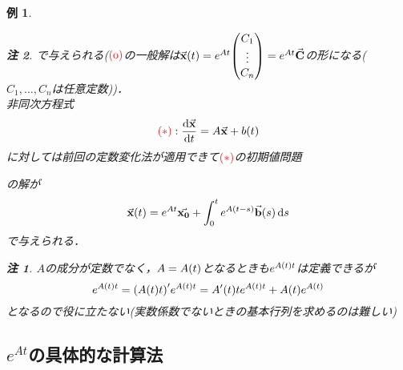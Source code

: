 \documentclass[autodetect-engine,dvipdfmx-if-dvi,ja=standard]{bxjsarticle}
\theoremstyle{mystyle1}
\theoremstyle{mystyle2}
\newtheorem{example}{例}
\newtheorem{note}{注}
\newcommand{\redast}{\ensuremath{\color{red}\qty(\ast)\color{black}}}
\newcommand{\redo}{\ensuremath{\color{red}\qty(\textrm{o})\color{black}}}
\begin{document}
\begin{example}
\begin{itemize}
\begin{itemize}
\begin{note}
                    で与えられる(\redo の一般解は$\va{x}\qty(t)=e^{At}\mqty(
                      C_1\\
                      \vdots\\
                      C_n
                      )=e^{At}\va{C}$の形になる($C_1,\ldots,C_n$は任意定数))．\\
                    非同次方程式
                    \[\redast:\dv{\va{x}}{t}=A\va{x}+b\qty(t)\]
                    に対しては前回の定数変化法が適用できて\redast の初期値問題
                    の解が
                    \[\va{x}\qty(t)=e^{At}\va{x_0}+\int_0^te^{A\qty(t-s)}\va{b}\qty(s)\dd{s}\]
                    で与えられる．
                    \begin{note}
                      $A$の成分が定数でなく，$A=A\qty(t)$となるときも$e^{A\qty(t)t}$は定義できるが
                      \[e^{A\qty(t)t}=\qty(A\qty(t)t)^\prime e^{A\qty(t)t}=A^\prime\qty(t)te^{A\qty(t)t}+A\qty(t)e^{A\qty(t)}\]
                      となるので役に立たない(実数係数でないときの基本行列を求めるのは難しい)
                    \end{note}
                  \end{note}
          \end{itemize}
  \end{itemize}
\end{example}
\subsection{$e^{At}$の具体的な計算法}
\end{document}
